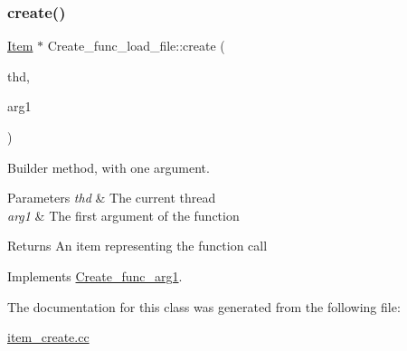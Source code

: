\subsubsection{\texorpdfstring{create()}{create()}}
{\footnotesize\ttfamily \mbox{\hyperlink{classItem}{Item}} $\ast$ Create\+\_\+func\+\_\+load\+\_\+file\+::create (\begin{DoxyParamCaption}\item[{T\+HD $\ast$}]{thd,  }\item[{\mbox{\hyperlink{classItem}{Item}} $\ast$}]{arg1 }\end{DoxyParamCaption})\hspace{0.3cm}{\ttfamily [virtual]}}

Builder method, with one argument. 
\begin{DoxyParams}{Parameters}
{\em thd} & The current thread \\
\hline
{\em arg1} & The first argument of the function \\
\hline
\end{DoxyParams}
\begin{DoxyReturn}{Returns}
An item representing the function call 
\end{DoxyReturn}


Implements \mbox{\hyperlink{classCreate__func__arg1_a3e9a98f755cd82c3e762e334c955a8c9}{Create\+\_\+func\+\_\+arg1}}.



The documentation for this class was generated from the following file\+:\begin{DoxyCompactItemize}
\item 
\mbox{\hyperlink{item__create_8cc}{item\+\_\+create.\+cc}}\end{DoxyCompactItemize}
